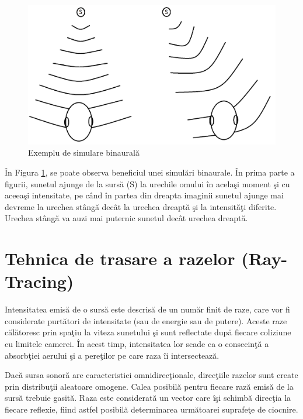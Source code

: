 	\begin{figure}[!htb]
		\centering
		\includegraphics[width=1\linewidth]{imagini/binauralExample.png}
		\caption{Exemplu de simulare binaural\u{a}}
		\label{Fig12}
	\end{figure}

	\^{I}n Figura \ref{Fig12}, se poate observa beneficiul unei simul\u{a}ri binaurale. \^{I}n prima parte a figurii, sunetul ajunge de la surs\u{a} (S) la urechile omului \^{i}n acela\c{s}i moment \c{s}i cu aceea\c{s}i intensitate, pe c\^{a}nd \^{i}n partea din dreapta imaginii sunetul ajunge mai devreme la urechea st\^{a}ng\u{a} dec\^{a}t la urechea dreapt\u{a} \c{s}i la intensit\u{a}\c{t}i diferite. Urechea st\^{a}ng\u{a} va auzi mai puternic sunetul dec\^{a}t urechea dreapt\u{a}. 

	\section{Tehnica de trasare a razelor (Ray-Tracing)}
	
	Intensitatea emis\u{a} de o surs\u{a} este descris\u{a} de un num\u{a}r finit de raze, care vor fi considerate purt\u{a}tori de intensitate (sau de energie sau de putere). Aceste raze c\u{a}l\u{a}toresc prin spa\c{t}iu la viteza sunetului \c{s}i sunt reflectate dup\u{a} fiecare coliziune cu limitele camerei. \^{I}n acest timp, intensitatea lor scade ca o consecin\c{t}\u{a} a absorb\c{t}iei aerului \c{s}i a pere\c{t}ilor pe care raza \^{i}i intersecteaz\u{a}.
	 
	
	Dac\u{a} sursa sonor\u{a} are caracteristici omnidirec\c{t}ionale, direc\c{t}iile razelor sunt create prin distribu\c{t}ii aleatoare omogene. Calea posibil\u{a} pentru fiecare raz\u{a} emis\u{a} de la surs\u{a} trebuie gasit\u{a}. Raza este considerat\u{a} un vector care \^{i}\c{s}i schimb\u{a} direc\c{t}ia la fiecare reflexie, fiind astfel posibil\u{a} determinarea urm\u{a}toarei suprafe\c{t}e de ciocnire. 
	 
